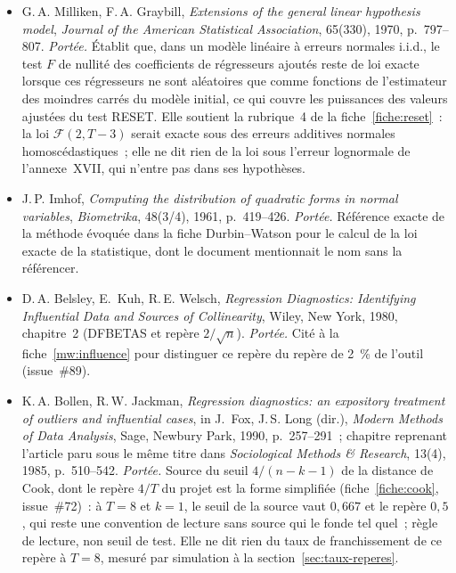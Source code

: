 \documentclass[a4paper,11pt]{article}
\begin{document}
\begin{itemize}[itemsep=4pt]
  \item G.\,A. Milliken, F.\,A. Graybill, \emph{Extensions of the general
  linear hypothesis model}, \emph{Journal of the American Statistical
  Association}, 65(330), 1970, p.~797--807.
  \emph{Portée.} Établit que, dans un modèle linéaire à erreurs normales
  i.i.d., le test $F$ de nullité des coefficients de régresseurs ajoutés reste
  de loi exacte lorsque ces régresseurs ne sont aléatoires que comme fonctions
  de l'estimateur des moindres carrés du modèle initial, ce qui couvre les
  puissances des valeurs ajustées du test RESET. Elle soutient la rubrique~4 de
  la fiche~\ref{fiche:reset}~: la loi $\mathcal{F}(2, T-3)$ serait exacte sous
  des erreurs additives normales homoscédastiques~; elle ne dit rien de la loi
  sous l'erreur lognormale de l'annexe~XVII, qui n'entre pas dans ses
  hypothèses.

  \item J.\,P. Imhof, \emph{Computing the distribution of quadratic forms in
  normal variables}, \emph{Biometrika}, 48(3/4), 1961, p.~419--426.
  \emph{Portée.} Référence exacte de la méthode évoquée dans la
  fiche Durbin--Watson pour le calcul de la loi exacte de la statistique, dont
  le document mentionnait le nom sans la référencer.

  \item D.\,A. Belsley, E.~Kuh, R.\,E. Welsch, \emph{Regression Diagnostics: Identifying
  Influential Data and Sources of Collinearity}, Wiley, New York, 1980, chapitre~2 (DFBETAS et
  repère $2/\sqrt{n}$).
  \emph{Portée.} Cité à la fiche~\ref{mw:influence} pour distinguer ce repère du repère de
  2~\% de l'outil (issue~\#89).

  \item K.\,A. Bollen, R.\,W. Jackman, \emph{Regression diagnostics: an expository treatment of
  outliers and influential cases}, in J.~Fox, J.\,S. Long (dir.), \emph{Modern Methods of Data
  Analysis}, Sage, Newbury Park, 1990, p.~257--291~; chapitre reprenant l'article paru sous le
  même titre dans \emph{Sociological Methods \& Research}, 13(4), 1985, p.~510--542.
  \emph{Portée.} Source du seuil $4/(n-k-1)$ de la distance de Cook, dont le repère $4/T$ du
  projet est la forme simplifiée (fiche~\ref{fiche:cook}, issue~\#72)~: à $T = 8$ et $k = 1$, le
  seuil de la source vaut $0{,}667$ et le repère $0{,}5$, qui reste une convention de lecture
  sans source qui le fonde tel quel~; règle de lecture, non seuil de test. Elle ne dit rien
  du taux de franchissement de ce repère à $T = 8$, mesuré par simulation à la
  section~\ref{sec:taux-reperes}.


\end{itemize}
\end{document}
